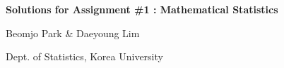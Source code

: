 \documentclass{article}
\begin{document}
\newpage

\begin{minipage}{\columnwidth}
\centering
\textbf{{\LARGE Solutions for Assignment \#1 : Mathematical Statistics}}

\vspace{15pt}
{\Large Beomjo Park \& Daeyoung Lim}

Dept. of Statistics, Korea University
\end{minipage}
\end{document}
